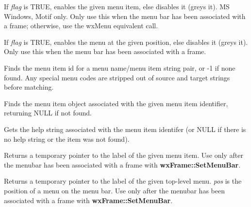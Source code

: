 If {\it flag} is TRUE, enables the given menu item, else disables it
(greys it). MS Windows, Motif only. Only use this when the menu bar has been
associated with a frame; otherwise, use the wxMenu equivalent call.



If {\it flag} is TRUE, enables the menu at the given position, else
disables it (greys it). Only use this when the menu bar has been
associated with a frame.



Finds the menu item id for a menu name/menu item string pair, or -1 if none found.
Any special menu codes are stripped out of source and target strings
before matching.



Finds the menu item object associated with the given menu item identifier,
returning NULL if not found.



Gets the help string associated with the menu item identifer (or NULL if
there is no help string or the item was not found).



Returns a temporary pointer to the label of the given menu item. Use only
after the menubar has been associated with a frame with {\bf
wxFrame::SetMenuBar}.



Returns a temporary pointer to the label of the given top-level menu. {\it
pos} is the position of a menu on the menu bar. Use only after the
menubar has been associated with a frame with {\bf wxFrame::SetMenuBar}.



